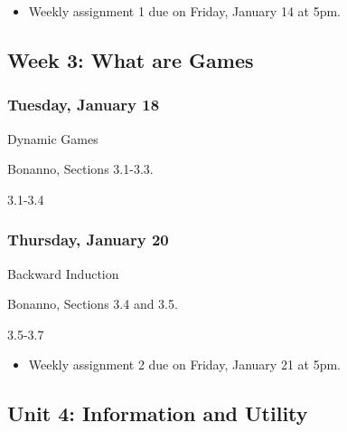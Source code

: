 \documentclass[
]{article}
\providecommand{\tightlist}{%
  \setlength{\itemsep}{0pt}\setlength{\parskip}{0pt}}
\begin{document}
\begin{itemize}
\tightlist
\item
  Weekly assignment 1 due on Friday, January 14 at 5pm.
\end{itemize}

\hypertarget{week-3-what-are-games}{%
\subsection{Week 3: What are Games}\label{week-3-what-are-games}}

\begin{multicols}{2}

\hypertarget{tuesday-january-18}{%
\subsubsection{Tuesday, January 18}\label{tuesday-january-18}}

\begin{description}
\tightlist
\item[Topic]
Dynamic Games
\item[Reading]
Bonanno, Sections 3.1-3.3.
\item[Video lectures]
3.1-3.4
\end{description}

\hypertarget{thursday-january-20}{%
\subsubsection{Thursday, January 20}\label{thursday-january-20}}

\begin{description}
\tightlist
\item[Topic]
Backward Induction
\item[Reading]
Bonanno, Sections 3.4 and 3.5.
\item[Video lectures]
3.5-3.7
\end{description}

\end{multicols}

\begin{itemize}
\tightlist
\item
  Weekly assignment 2 due on Friday, January 21 at 5pm.
\end{itemize}

\hypertarget{unit-4-information-and-utility}{%
\subsection{Unit 4: Information and
Utility}\label{unit-4-information-and-utility}}
\end{document}
